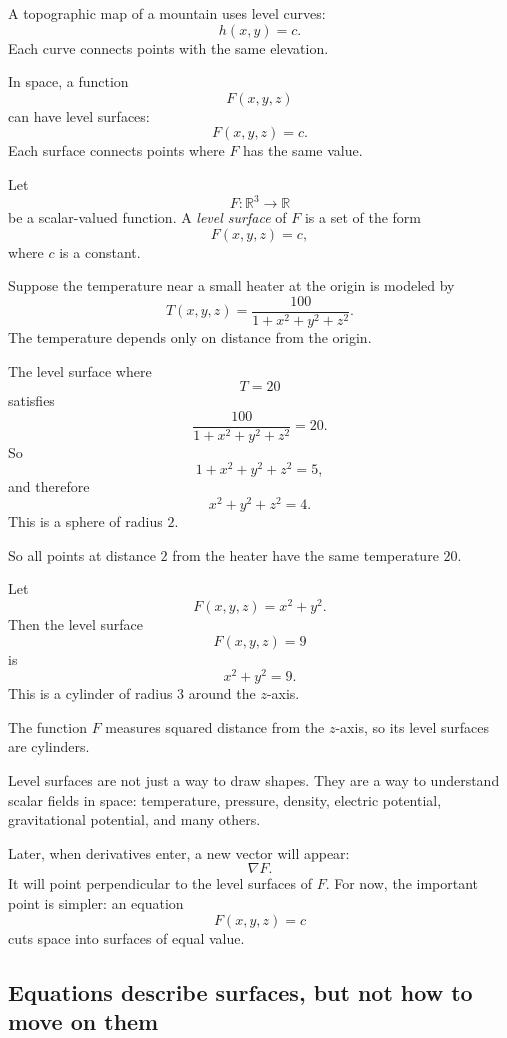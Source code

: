 A topographic map of a mountain uses level curves:
\[
    h(x,y)=c.
\]
Each curve connects points with the same elevation.

In space, a function
\[
    F(x,y,z)
\]
can have level surfaces:
\[
    F(x,y,z)=c.
\]
Each surface connects points where \(F\) has the same value.

\begin{definition}
Let
\[
    F:\mathbb R^3\to\mathbb R
\]
be a scalar-valued function.  A \emph{level surface} of \(F\) is a set of the form
\[
    F(x,y,z)=c,
\]
where \(c\) is a constant.
\end{definition}

\begin{example}
Suppose the temperature near a small heater at the origin is modeled by
\[
    T(x,y,z)=\frac{100}{1+x^2+y^2+z^2}.
\]
The temperature depends only on distance from the origin.

The level surface where
\[
    T=20
\]
satisfies
\[
    \frac{100}{1+x^2+y^2+z^2}=20.
\]
So
\[
    1+x^2+y^2+z^2=5,
\]
and therefore
\[
    x^2+y^2+z^2=4.
\]
This is a sphere of radius \(2\).

So all points at distance \(2\) from the heater have the same temperature \(20\).
\end{example}

\begin{example}
Let
\[
    F(x,y,z)=x^2+y^2.
\]
Then the level surface
\[
    F(x,y,z)=9
\]
is
\[
    x^2+y^2=9.
\]
This is a cylinder of radius \(3\) around the \(z\)-axis.

The function \(F\) measures squared distance from the \(z\)-axis, so its level surfaces
are cylinders.
\end{example}

Level surfaces are not just a way to draw shapes.  They are a way to understand scalar
fields in space: temperature, pressure, density, electric potential, gravitational potential,
and many others.

Later, when derivatives enter, a new vector will appear:
\[
    \nabla F.
\]
It will point perpendicular to the level surfaces of \(F\).  For now, the important point is
simpler: an equation
\[
    F(x,y,z)=c
\]
cuts space into surfaces of equal value.

\subsection{Equations describe surfaces, but not how to move on them}

